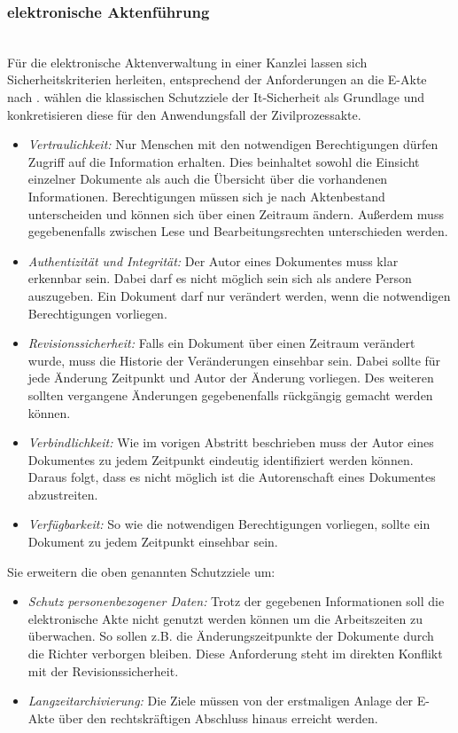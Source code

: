 \subsubsection{elektronische Aktenführung}\hspace*{\fill} \\
Für die elektronische Aktenverwaltung in einer Kanzlei lassen sich Sicherheitskriterien herleiten, entsprechend der Anforderungen an die E-Akte nach \citeauthor{eakten-anforderungen}.
\textcite{eakten-anforderungen} wählen die klassischen Schutzziele der It-Sicherheit als Grundlage und konkretisieren diese für den Anwendungsfall der Zivilprozessakte.
\begin{itemize}
\item \textit{Vertraulichkeit:}
Nur Menschen mit den notwendigen Berechtigungen dürfen Zugriff auf die Information erhalten. Dies beinhaltet sowohl die Einsicht einzelner Dokumente als auch die Übersicht über die vorhandenen Informationen. Berechtigungen müssen sich je nach Aktenbestand unterscheiden und können sich über einen Zeitraum ändern. Außerdem muss gegebenenfalls zwischen Lese und Bearbeitungsrechten unterschieden werden.
\item \textit{Authentizität und Integrität:}
Der Autor eines Dokumentes muss klar erkennbar sein. Dabei darf es nicht möglich sein sich als andere Person auszugeben. Ein Dokument darf nur verändert werden, wenn die notwendigen Berechtigungen vorliegen. 
\item \textit{Revisionssicherheit:}
Falls ein Dokument über einen Zeitraum verändert wurde, muss die Historie der Veränderungen einsehbar sein. Dabei sollte für jede Änderung Zeitpunkt und Autor der Änderung vorliegen. Des weiteren sollten vergangene Änderungen gegebenenfalls rückgängig gemacht werden können.
\item \textit{Verbindlichkeit:}
Wie im vorigen Abstritt beschrieben muss der Autor eines Dokumentes zu jedem Zeitpunkt eindeutig identifiziert werden können. Daraus folgt, dass es nicht möglich ist die Autorenschaft eines Dokumentes abzustreiten.
\item \textit{Verfügbarkeit:}
So wie die notwendigen Berechtigungen vorliegen, sollte ein Dokument zu jedem Zeitpunkt einsehbar sein.
\end{itemize}
Sie erweitern die oben genannten Schutzziele um:
\begin{itemize}
\item \textit{Schutz personenbezogener Daten:}
Trotz der gegebenen Informationen soll die elektronische Akte nicht genutzt werden können um die Arbeitszeiten zu überwachen. So sollen z.B. die Änderungszeitpunkte der Dokumente durch die Richter verborgen bleiben. Diese Anforderung steht im direkten Konflikt mit der Revisionssicherheit.
\item \textit{Langzeitarchivierung:}
Die Ziele müssen von der erstmaligen Anlage der E-Akte über den rechtskräftigen Abschluss hinaus erreicht werden.
\end{itemize}
